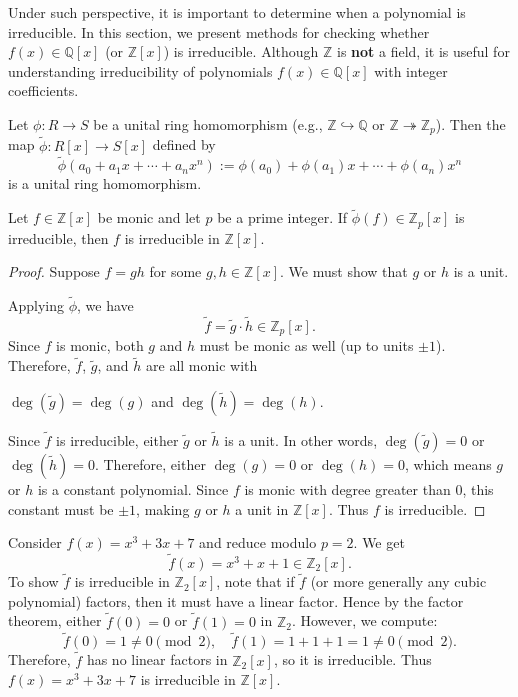 {\medskip
Under such perspective, it is important to determine when a polynomial is irreducible. In this section, we present methods for checking whether $f(x) \in \mathbb{Q}[x]$ (or $\mathbb{Z}[x]$) is irreducible. Although $\mathbb{Z}$ is \textbf{not} a field, it is useful for understanding irreducibility of polynomials $f(x) \in \mathbb{Q}[x]$ with integer coefficients.

\begin{lemma}
Let $\phi: R \to S$ be a unital ring homomorphism (e.g., $\mathbb{Z} \hookrightarrow \mathbb{Q}$ or $\mathbb{Z} \twoheadrightarrow \mathbb{Z}_p$). Then the map $\tilde{\phi}: R[x] \to S[x]$ defined by 
\[
\tilde{\phi}(a_0 + a_1 x + \cdots + a_n x^n) := \phi(a_0) + \phi(a_1) x + \cdots + \phi(a_n) x^n
\]
is a unital ring homomorphism.
\end{lemma}

\begin{theorem}
Let $f \in \mathbb{Z}[x]$ be monic and let $p$ be a prime integer. If $\tilde{\phi}(f) \in \mathbb{Z}_p[x]$ is irreducible, then $f$ is irreducible in $\mathbb{Z}[x]$.
\end{theorem}

\begin{proof}
Suppose $f = gh$ for some $g, h \in \mathbb{Z}[x]$. We must show that $g$ or $h$ is a unit.

Applying $\tilde{\phi}$, we have 
$$\tilde{f} = \tilde{g} \cdot \tilde{h} \in \mathbb{Z}_p[x].$$ Since $f$ is monic, both $g$ and $h$ must be monic as well (up to units $\pm 1$). Therefore, $\tilde{f}$, $\tilde{g}$, and $\tilde{h}$ are all monic with 
\begin{center}
$\deg(\tilde{g}) = \deg(g)$ and $\deg(\tilde{h}) = \deg(h)$.
\end{center}
Since $\tilde{f}$ is irreducible, either $\tilde{g}$ or $\tilde{h}$ is a unit. In other words, $\deg(\tilde{g}) = 0$ or $\deg(\tilde{h}) = 0$. Therefore, either $\deg(g) = 0$ or $\deg(h) = 0$, which means $g$ or $h$ is a constant polynomial. Since $f$ is monic with degree greater than $0$, this constant must be $\pm 1$, making $g$ or $h$ a unit in $\mathbb{Z}[x]$. Thus $f$ is irreducible.
\end{proof}

\begin{example}
Consider $f(x) = x^3 + 3x + 7$ and reduce modulo $p = 2$. We get 
$$\tilde{f}(x) = x^3 + x + 1 \in \mathbb{Z}_2[x].$$
To show $\tilde{f}$ is irreducible in $\mathbb{Z}_2[x]$, note that if $\tilde{f}$ (or more generally any cubic polynomial) factors, then it must have a linear factor. Hence by the factor theorem, either $\tilde{f}(0) = 0$ or $\tilde{f}(1) = 0$ in $\mathbb{Z}_2$. However, we compute:
\[
\tilde{f}(0) = 1 \neq 0 \pmod{2}, \quad \tilde{f}(1) = 1 + 1 + 1 = 1 \neq 0 \pmod{2}.
\]
Therefore, $\tilde{f}$ has no linear factors in $\mathbb{Z}_2[x]$, so it is irreducible. Thus $f(x) = x^3 + 3x + 7$ is irreducible in $\mathbb{Z}[x]$.
\end{example}

}
